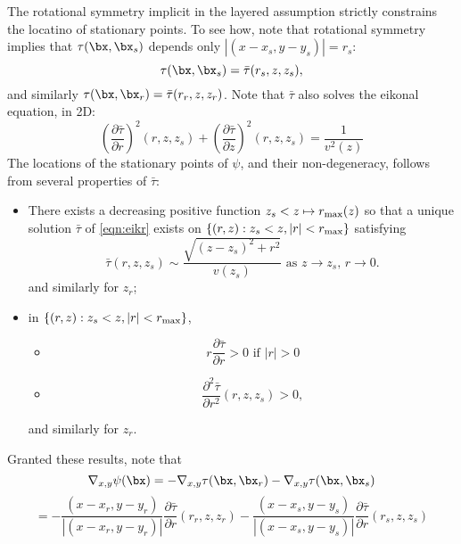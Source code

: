 The rotational symmetry implicit in the layered assumption strictly constrains the locatino of stationary points. To see how, note that rotational symmetry implies that $\tau(\bx,\bx_s)$ depends only $|(x-x_s,y-y_s)| = r_s$:
\begin{equation}
\label{eqn:bartaudef}
\tau(\bx,\bx_s) = \bar{\tau}(r_s,z,z_s),
\end{equation}
and similarly $\tau(\bx,\bx_r) = \bar{\tau}(r_r,z,z_r)$. Note that $\bar{\tau}$ also solves the eikonal equation, in 2D:
\begin{equation}
\label{eqn:eikr}
\left(\frac{\partial \bar{\tau}}{\partial r}\right)^2(r,z,z_s) +\left(\frac{\partial \bar{\tau}}{\partial z}\right)^2(r,z,z_s) = \frac{1}{v^2(z)}
\end{equation}
The locations of the stationary points of $\psi$, and their non-degeneracy, follows from several properties of $\bar{\tau}$:
\begin{itemize}
\item There exists a decreasing positive function $z_s < z \mapsto r_{\rm max}(z)$ so that a unique solution  $\bar{\tau}$ of \ref{eqn:eikr} exists on $\{(r,z): z_s< z, |r| < r_{\rm max}\}$ satisfying 
\begin{equation}
\label{eqn:initeikr}
\bar{\tau}(r,z,z_s) \sim \frac{\sqrt{(z-z_s)^2+r^2}}{v(z_s)} \mbox{ as } z \rightarrow z_s, \, r \rightarrow 0.
\end{equation}
and similarly for $z_r$;
\item in $\{(r,z): z_s< z, |r| < r_{\rm max}\}$,
\begin{itemize}
\item \begin{equation}
\label{eqn:bartauincr}
r\frac{\partial \bar{\tau}}{\partial r} >0 \mbox{ if }|r|>0
\end{equation}
\item \begin{equation}
\label{eqn:bartauconv}
\frac{\partial^2 \bar{\tau}}{\partial r^2} (r,z,z_s) > 0,
\end{equation}
\end{itemize}
and similarly for $z_r$.
\end{itemize}
Granted these results, note that 
\[
\nabla_{x,y} \psi(\bx) = -\nabla_{x,y}\tau(\bx,\bx_r) - \nabla_{x,y}\tau(\bx,\bx_s)
\]
\begin{equation}
\label{eqn:statcondr}
=-\frac{(x-x_r,y-y_r)}{|(x-x_r,y-y_r)|}\frac{\partial \bar{\tau}}{\partial r}(r_r,z,z_r)
-\frac{(x-x_s,y-y_s)}{|(x-x_s,y-y_s)|}\frac{\partial \bar{\tau}}{\partial r}(r_s,z,z_s)
\end{equation}
